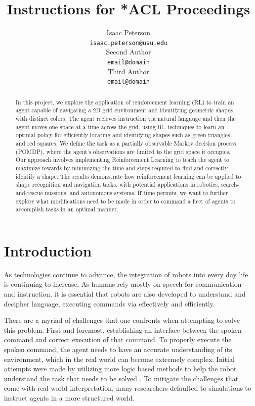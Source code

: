 \documentclass[11pt]{article}
\title{Instructions for *ACL Proceedings}
\author{Isaac Peterson \\
  \texttt{isaac.peterson@usu.edu} \\\And
  Second Author \\
  \texttt{email@domain} \\\And 
  Third Author \\
  \texttt{email@domain} 
  }
\begin{document}
\maketitle
\begin{abstract}
  In this project, we explore the application of reinforcement learning (RL) to train an agent capable of navigating a 2D grid environment and identifying geometric shapes with distinct colors. The agent recieves instruction via natural langauge and then the agent moves one space at a time across the grid, using RL techniques to learn an optimal policy for efficiently locating and identifying shapes such as green triangles and red squares. We define the task as a partially observable Markov decision process (POMDP), where the agent's observations are limited to the grid space it occupies. Our approach involves implementing Reinforcement Learning to teach the agent to maximize rewards by minimizing the time and steps required to find and correctly identify a shape. The results demonstrate how reinforcement learning can be applied to shape recognition and navigation tasks, with potential applications in robotics, search-and-rescue missions, and autonomous systems. If time permits, we want to further explore what modifications need to be made in order to command a fleet of agents to accomplish tasks in an optimal manner.

\end{abstract}

\section{Introduction}
As technologies continue to advance, the integration of robots into every day life is continuing to increase. As humans rely mostly on speech for communication and instruction, it is essential that robots are also developed to understand and decipher language, executing commands via effectively and efficiently. 

There are a myriad of challenges that one confronts when attempting to solve this problem. First and foremost, establishing an interface between the spoken command and correct execution of that command. To properly execute the spoken command, the agent needs to have an accurate understanding of its environment, which in the real world can become extremely complex. Initial attempts were made by utilizing more logic based methods to help the robot understand the task that needs to be solved \cite{Liu2016}. To mitigate the challenges that come with real world interpretation, many researchers defaulted to simulations to instruct agents in a more structured world.
\end{document}
